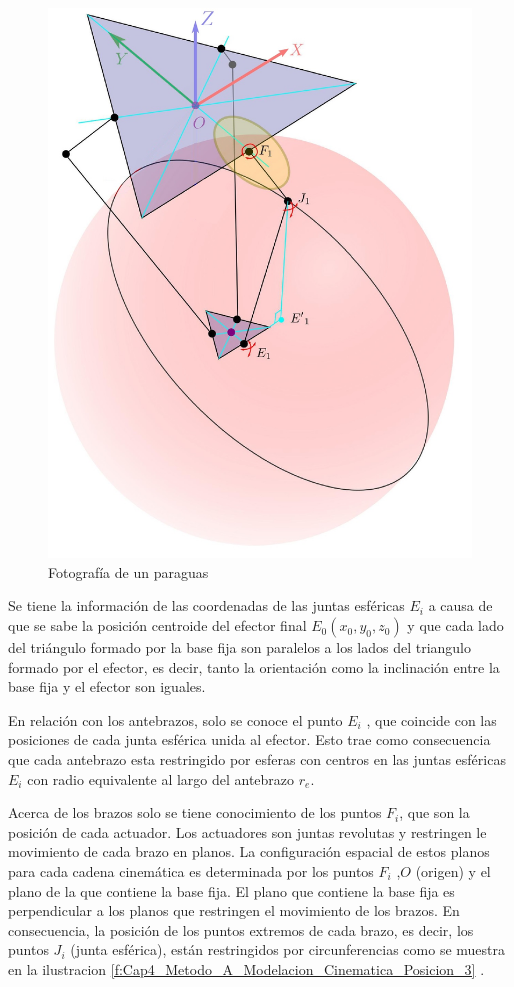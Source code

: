         
        \begin{figure}[htb]
             \centering
             \includegraphics[width=0.43\linewidth]{Main/Chapter4/Images4/DIBUJO6.jpg}
              \caption{Fotografía de un paraguas}
              \label{f:Cap4_Metodo_A_Modelacion_Cinematica_Posicion_4}
        \end{figure}
        
         Se tiene la informaci\'{o}n de las coordenadas de las juntas esf\'{e}ricas $E_i$ a causa de que se sabe la posici\'{o}n centroide del efector final $E_0(x_0,y_0,z_0)$ y que cada lado del tri\'{a}ngulo formado por la base fija son paralelos a los lados del triangulo formado por el efector, es decir, tanto la orientaci\'{o}n como la inclinaci\'{o}n entre la base fija y el efector son iguales.  

        En relaci\'{o}n con los antebrazos, solo se conoce el punto $E_i$ , que coincide con las posiciones de cada junta esf\'{e}rica unida al efector. Esto trae como consecuencia que cada antebrazo esta restringido por esferas con centros en las juntas esf\'{e}ricas $E_i$ con radio equivalente al largo del antebrazo $r_e$.
    
        Acerca de los brazos solo se tiene conocimiento de los puntos $F_i$, que son la posici\'{o}n de cada actuador. Los actuadores son juntas revolutas y restringen le movimiento de cada brazo en planos. La configuraci\'{o}n espacial de estos planos para cada cadena cinem\'{a}tica es determinada por los puntos $F_i$ ,$O$ (origen) y el plano de la que contiene la base fija. El plano que contiene la base fija es perpendicular a los planos que restringen el movimiento de los brazos. En consecuencia, la posici\'{o}n de los puntos extremos de cada brazo, es decir, los puntos $J_i$ (junta esf\'{e}rica), est\'{a}n restringidos por circunferencias como se muestra en la ilustracion \ref{f:Cap4_Metodo_A_Modelacion_Cinematica_Posicion_3} .

